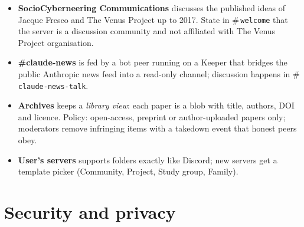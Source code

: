 \documentclass[11pt,a4paper]{article}
\newcommand{\ch}[1]{{\color{ccgray}\#}\,\texttt{#1}}
\begin{document}
\begin{note}
\begin{itemize}[leftmargin=1.2em]
  \item \textbf{SocioCyberneering Communications} discusses the published ideas of Jacque
        Fresco and The Venus Project up to 2017. State in \ch{welcome} that the server is
        a discussion community and not affiliated with The Venus Project organisation.
  \item \textbf{\#claude-news} is fed by a bot peer running on a Keeper that bridges the public
        Anthropic news feed into a read-only channel; discussion happens in
        \ch{claude-news-talk}.
  \item \textbf{Archives} keeps a \emph{library view}: each paper is a blob with title, authors,
        DOI and licence. Policy: open-access, preprint or author-uploaded papers only;
        moderators remove infringing items with a takedown event that honest peers obey.
  \item \textbf{User's servers} supports folders exactly like Discord; new servers get a
        template picker (Community, Project, Study group, Family).
\end{itemize}
\end{note}

\section{Security and privacy}
\label{sec:threats}
\end{document}

